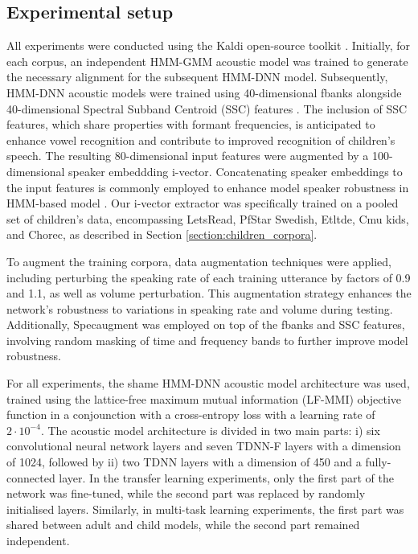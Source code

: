 

\subsection{Experimental setup}
\label{section:exp_setup}

All experiments were conducted using the Kaldi open-source toolkit \cite{kaldi}. Initially, for each corpus, an independent HMM-GMM acoustic model was trained to generate the necessary alignment for the subsequent HMM-DNN model. Subsequently, HMM-DNN acoustic models were trained using 40-dimensional fbanks alongside 40-dimensional Spectral Subband Centroid (SSC) features \cite{ssc}. The inclusion of SSC features, which share properties with formant frequencies, is anticipated to enhance vowel recognition and contribute to improved recognition of children's speech. The resulting 80-dimensional input features were augmented by a 100-dimensional speaker embeddding i-vector. Concatenating speaker embeddings to the input features is commonly employed to enhance model speaker robustness in HMM-based model \cite{ivector}. Our i-vector extractor was specifically trained on a pooled set of children's data, encompassing LetsRead, PfStar Swedish, Etltde, Cmu kids, and Chorec, as described in Section \ref{section:children_corpora}.

To augment the training corpora, data augmentation techniques were applied, including perturbing the speaking rate of each training utterance by factors of 0.9 and 1.1, as well as volume perturbation. This augmentation strategy enhances the network's robustness to variations in speaking rate and volume during testing. Additionally, Specaugment \cite{specaugment} was employed on top of the fbanks and SSC features, involving random masking of time and frequency bands to further improve model robustness.

For all experiments, the shame HMM-DNN acoustic model architecture was used, trained using the lattice-free maximum mutual information (LF-MMI) objective function  in a conjounction with a cross-entropy loss with a learning rate of $2\cdot10^{-4}$. The acoustic model architecture is divided in two main parts: i) six convolutional neural network layers and seven TDNN-F layers with a dimension of 1024, followed by ii) two TDNN layers with a dimension of 450 and a fully-connected layer. In the transfer learning experiments, only the first part of the network was fine-tuned, while the second part was replaced by randomly initialised layers. Similarly, in multi-task learning experiments, the first part was shared between adult and child models, while the second part remained independent. 


